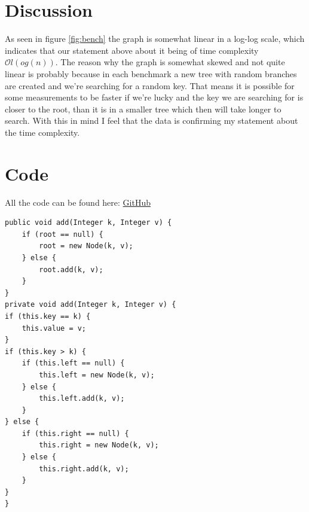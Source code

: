\documentclass[a4paper,11pt]{article}
\newenvironment{code}{\captionsetup{type=listing}}{}
\begin{document}
\section*{Discussion}
As seen in figure \ref{fig:bench} the graph is somewhat linear in a log-log scale, which
indicates that our statement above about it being of time complexity $\mathcal{O}l(og(n))$.
The reason why the graph is somewhat skewed and not quite linear is probably because
in each benchmark a new tree with random branches are created and we're searching for a
random key. That means it is possible for some measurements to be faster if
we're lucky and the key we are searching for is closer to the root, than it is in a smaller
tree which then will take longer to search. With this in mind I feel that the data is
confirming my statement about the time complexity.

\newpage
\FloatBarrier
\section*{Code}
All the code can be found here: \href{https://github.com/adrian-jonsson-sjoedin/ID1021-AlgoData/tree/main/Tasks/Trees/src}{GitHub}

\begin{code}
    \label{code:add}
    \begin{verbatim}
public void add(Integer k, Integer v) {
    if (root == null) {
        root = new Node(k, v);
    } else {
        root.add(k, v);
    }
}        
private void add(Integer k, Integer v) {
if (this.key == k) {
    this.value = v;
}
if (this.key > k) {
    if (this.left == null) {
        this.left = new Node(k, v);
    } else {
        this.left.add(k, v);
    }
} else {
    if (this.right == null) {
        this.right = new Node(k, v);
    } else {
        this.right.add(k, v);
    }
}
}
\end{verbatim}
\end{code}
\end{document}
